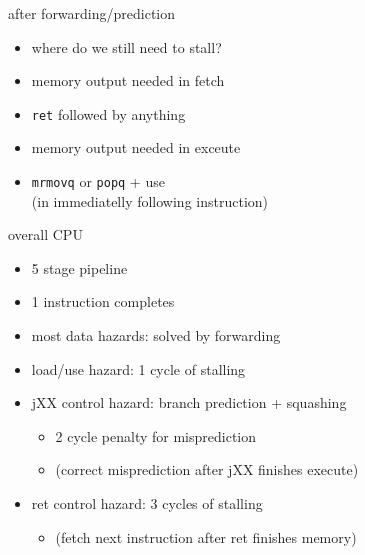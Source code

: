 \begin{frame}{after forwarding/prediction}
    \begin{itemize}
    \item where do we still need to stall?
    \vspace{.5cm}
    \item memory output needed in fetch 
    \vspace{-.25cm}
    \item \hspace{.5cm} {\tt ret} followed by anything
    \item memory output needed in exceute
    \vspace{-.25cm}
    \item \hspace{.5cm} {\tt mrmovq} or {\tt popq} + use  \\
          \hspace{.5cm} (in immediatelly following instruction)
    \end{itemize}
\end{frame}

\begin{frame}{overall CPU}
    \begin{itemize}
    \item 5 stage pipeline
    \item 1 instruction completes 
    \item most data hazards: solved by forwarding
    \item load/use hazard: 1 cycle of stalling
    \item jXX control hazard: branch prediction + squashing
        \begin{itemize}
            \item 2 cycle penalty for misprediction
            \item (correct misprediction after jXX finishes execute)
        \end{itemize}
    \item ret control hazard: 3 cycles of stalling
        \begin{itemize}
            \item (fetch next instruction after ret finishes memory)
        \end{itemize}
    \end{itemize}
\end{frame}

